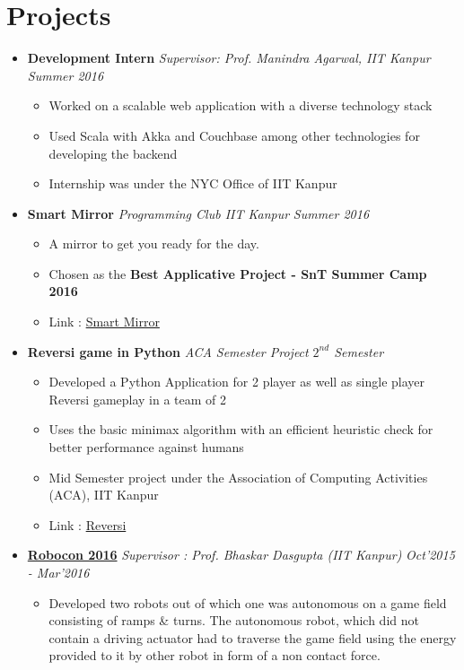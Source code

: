 \documentclass[11pt,a4paper]{moderncv}
\newcommand{\experience}[3]{
  \item \textbf{\large{#1}} \hfill \emph{#3} \hfill \textit{#2}
}
\begin{document}
  \section{Projects}
    \begin{itemize}
        \experience{Development Intern}{Summer 2016}{Supervisor: Prof. Manindra Agarwal, IIT Kanpur}
      \begin{itemize}
        \item Worked on a scalable web application with a diverse technology stack
        \item Used Scala with Akka and Couchbase among other technologies for developing the backend
        \item Internship was under the NYC Office of IIT Kanpur
      \end{itemize}
      \experience{Smart Mirror}{Summer 2016}{Programming Club IIT Kanpur}
      \begin{itemize}
        \item A mirror to get you ready for the day.
        \item Chosen as the \textbf{Best Applicative Project - SnT Summer Camp 2016}
        \item Link : \href{https://pclub.in/project/2016/07/06/smartmirror.html}{Smart Mirror}
      \end{itemize}
      \experience{Reversi game in Python}{$2^{nd}$ Semester}{ACA Semester Project}
      \begin{itemize}
        \item Developed a Python Application for 2 player as well as single player Reversi gameplay in a team of 2
        \item Uses the basic minimax algorithm with an efficient heuristic check for better performance against humans
        \item Mid Semester project under the Association of Computing Activities (ACA), IIT Kanpur
        \item Link : \href{http://github.com/yashsriv/Reversi-Python}{Reversi}
      \end{itemize}
      \experience{\href{http://students.iitk.ac.in/robocon/}{Robocon 2016}}{Oct'2015 - Mar'2016}{Supervisor : Prof. Bhaskar Dasgupta (IIT Kanpur)}
      \begin{itemize}
        \item Developed two robots out of which one was autonomous on a game field consisting of ramps \& turns. The autonomous robot, which did not contain a driving actuator had to traverse the game field using the energy provided to it by other robot in form of a non contact force.

\end{itemize}
\end{itemize}
\end{document}
